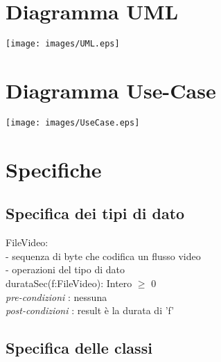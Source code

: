 \documentclass[12pt, letterpaper]{article}
\newcommand{\id}{{\hphantom{ident}}}
\begin{document}
\section{Diagramma UML}\begin{center}
    \texttt{[image: images/UML.eps]}
\end{center}
\newpage
\section{Diagramma Use-Case}\begin{center}
    \texttt{[image: images/UseCase.eps]}
\end{center}
\newpage
\section{Specifiche}
\subsection{Specifica dei tipi di dato}
FileVideo:      \\
\id- sequenza di byte che codifica un flusso video \\    
\id- operazioni del tipo di dato      \\ 
\id durataSec(f:FileVideo): Intero $\ge$ 0\\
\id \id \textit{pre-condizioni} :  nessuna\\
\id \id \textit{post-condizioni} : result è la durata di 'f'
\subsection{Specifica delle classi}
\end{document}
